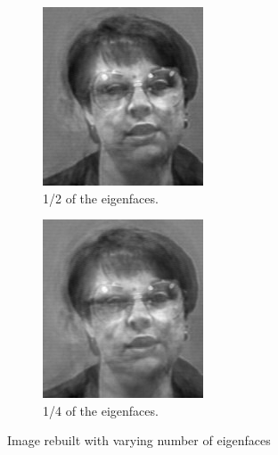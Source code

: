 \begin{figure}
\begin{subfigure}[b]{0.3\textwidth}
\includegraphics[width=\textwidth]{rebuiltHalf.png}
\caption{1/2 of the eigenfaces.}
\end{subfigure}
\begin{subfigure}[b]{0.3\textwidth}
\includegraphics[width=\textwidth]{rebuiltFourth.png}
\caption{1/4 of the eigenfaces.}
\end{subfigure}
\caption{Image rebuilt with varying number of eigenfaces}
\label{facialRecognition:rebuiltImage}
\end{figure}

